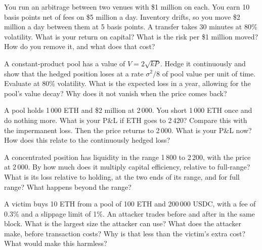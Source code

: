 \begin{question}\label{iq:iv2:crypto-for-traders-and-researchers:22}
You run an arbitrage between two venues with \$1 million on each. You earn 10 basis points net of fees on \$5 million a day. Inventory drifts, so you move \$2 million a day between them at 5 basis points. A transfer takes 30 minutes at 80\% volatility. What is your return on capital? What is the risk per \$1 million moved? How do you remove it, and what does that cost?
\end{question}

\begin{question}\label{iq:iv2:crypto-for-traders-and-researchers:23}
A constant-product pool has a value of $V = 2\sqrt{kP}$. Hedge it continuously and show that the hedged position loses at a rate $\sigma^2/8$ of pool value per unit of time. Evaluate at 80\% volatility. What is the expected loss in a year, allowing for the pool's value decay? Why does it not vanish when the price comes back?
\end{question}

\begin{question}\label{iq:iv2:crypto-for-traders-and-researchers:24}
A pool holds 1\,000 ETH and \$2 million at 2\,000. You short 1\,000 ETH once and do nothing more. What is your P\&L if ETH goes to 2\,420? Compare this with the impermanent loss. Then the price returns to 2\,000. What is your P\&L now? How does this relate to the continuously hedged loss?
\end{question}

\begin{question}\label{iq:iv2:crypto-for-traders-and-researchers:25}
A concentrated position has liquidity in the range 1\,800 to 2\,200, with the price at 2\,000. By how much does it multiply capital efficiency, relative to full-range? What is its loss relative to holding, at the two ends of its range, and for full range? What happens beyond the range?
\end{question}

\begin{question}\label{iq:iv2:crypto-for-traders-and-researchers:26}
A victim buys 10 ETH from a pool of 100 ETH and 200\,000 USDC, with a fee of 0.3\% and a slippage limit of 1\%. An attacker trades before and after in the same block. What is the largest size the attacker can use? What does the attacker make, before transaction costs? Why is that less than the victim's extra cost? What would make this harmless?
\end{question}


